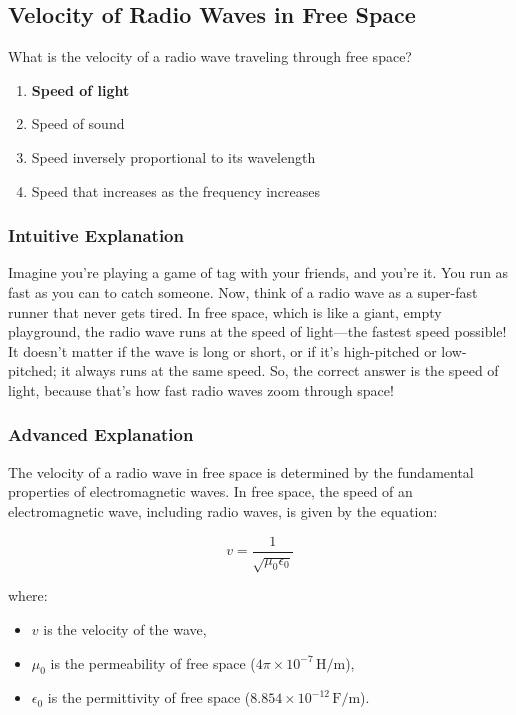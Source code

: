 \subsection{Velocity of Radio Waves in Free Space}
\label{T3B04}

\begin{tcolorbox}[colback=gray!10!white,colframe=black!75!black,title=T3B04]
What is the velocity of a radio wave traveling through free space?
\begin{enumerate}[label=\Alph*)]
    \item \textbf{Speed of light}
    \item Speed of sound
    \item Speed inversely proportional to its wavelength
    \item Speed that increases as the frequency increases
\end{enumerate}
\end{tcolorbox}

\subsubsection{Intuitive Explanation}
Imagine you're playing a game of tag with your friends, and you're it. You run as fast as you can to catch someone. Now, think of a radio wave as a super-fast runner that never gets tired. In free space, which is like a giant, empty playground, the radio wave runs at the speed of light—the fastest speed possible! It doesn't matter if the wave is long or short, or if it's high-pitched or low-pitched; it always runs at the same speed. So, the correct answer is the speed of light, because that's how fast radio waves zoom through space!

\subsubsection{Advanced Explanation}
The velocity of a radio wave in free space is determined by the fundamental properties of electromagnetic waves. In free space, the speed of an electromagnetic wave, including radio waves, is given by the equation:

\[
v = \frac{1}{\sqrt{\mu_0 \epsilon_0}}
\]

where:
\begin{itemize}
    \item \( v \) is the velocity of the wave,
    \item \( \mu_0 \) is the permeability of free space (\( 4\pi \times 10^{-7} \, \text{H/m} \)),
    \item \( \epsilon_0 \) is the permittivity of free space (\( 8.854 \times 10^{-12} \, \text{F/m} \)).
\end{itemize}

